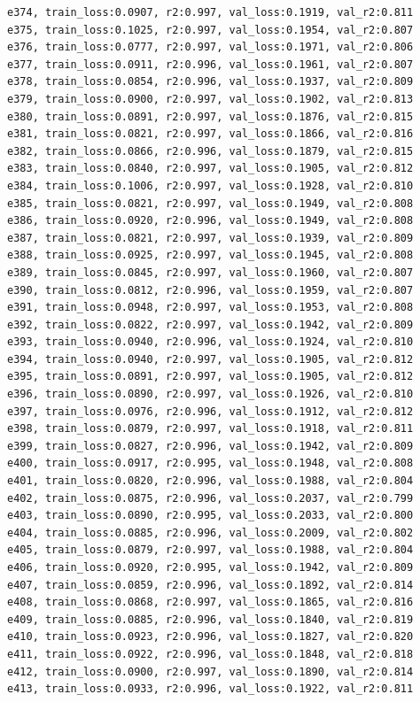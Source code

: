 \documentclass[a4paper, 12pt]{article}
\begin{document}
\begin{lstlisting}
e374, train_loss:0.0907, r2:0.997, val_loss:0.1919, val_r2:0.811
e375, train_loss:0.1025, r2:0.997, val_loss:0.1954, val_r2:0.807
e376, train_loss:0.0777, r2:0.997, val_loss:0.1971, val_r2:0.806
e377, train_loss:0.0911, r2:0.996, val_loss:0.1961, val_r2:0.807
e378, train_loss:0.0854, r2:0.996, val_loss:0.1937, val_r2:0.809
e379, train_loss:0.0900, r2:0.997, val_loss:0.1902, val_r2:0.813
e380, train_loss:0.0891, r2:0.997, val_loss:0.1876, val_r2:0.815
e381, train_loss:0.0821, r2:0.997, val_loss:0.1866, val_r2:0.816
e382, train_loss:0.0866, r2:0.996, val_loss:0.1879, val_r2:0.815
e383, train_loss:0.0840, r2:0.997, val_loss:0.1905, val_r2:0.812
e384, train_loss:0.1006, r2:0.997, val_loss:0.1928, val_r2:0.810
e385, train_loss:0.0821, r2:0.997, val_loss:0.1949, val_r2:0.808
e386, train_loss:0.0920, r2:0.996, val_loss:0.1949, val_r2:0.808
e387, train_loss:0.0821, r2:0.997, val_loss:0.1939, val_r2:0.809
e388, train_loss:0.0925, r2:0.997, val_loss:0.1945, val_r2:0.808
e389, train_loss:0.0845, r2:0.997, val_loss:0.1960, val_r2:0.807
e390, train_loss:0.0812, r2:0.996, val_loss:0.1959, val_r2:0.807
e391, train_loss:0.0948, r2:0.997, val_loss:0.1953, val_r2:0.808
e392, train_loss:0.0822, r2:0.997, val_loss:0.1942, val_r2:0.809
e393, train_loss:0.0940, r2:0.996, val_loss:0.1924, val_r2:0.810
e394, train_loss:0.0940, r2:0.997, val_loss:0.1905, val_r2:0.812
e395, train_loss:0.0891, r2:0.997, val_loss:0.1905, val_r2:0.812
e396, train_loss:0.0890, r2:0.997, val_loss:0.1926, val_r2:0.810
e397, train_loss:0.0976, r2:0.996, val_loss:0.1912, val_r2:0.812
e398, train_loss:0.0879, r2:0.997, val_loss:0.1918, val_r2:0.811
e399, train_loss:0.0827, r2:0.996, val_loss:0.1942, val_r2:0.809
e400, train_loss:0.0917, r2:0.995, val_loss:0.1948, val_r2:0.808
e401, train_loss:0.0820, r2:0.996, val_loss:0.1988, val_r2:0.804
e402, train_loss:0.0875, r2:0.996, val_loss:0.2037, val_r2:0.799
e403, train_loss:0.0890, r2:0.995, val_loss:0.2033, val_r2:0.800
e404, train_loss:0.0885, r2:0.996, val_loss:0.2009, val_r2:0.802
e405, train_loss:0.0879, r2:0.997, val_loss:0.1988, val_r2:0.804
e406, train_loss:0.0920, r2:0.995, val_loss:0.1942, val_r2:0.809
e407, train_loss:0.0859, r2:0.996, val_loss:0.1892, val_r2:0.814
e408, train_loss:0.0868, r2:0.997, val_loss:0.1865, val_r2:0.816
e409, train_loss:0.0885, r2:0.996, val_loss:0.1840, val_r2:0.819
e410, train_loss:0.0923, r2:0.996, val_loss:0.1827, val_r2:0.820
e411, train_loss:0.0922, r2:0.996, val_loss:0.1848, val_r2:0.818
e412, train_loss:0.0900, r2:0.997, val_loss:0.1890, val_r2:0.814
e413, train_loss:0.0933, r2:0.996, val_loss:0.1922, val_r2:0.811

\end{lstlisting}
\end{document}
